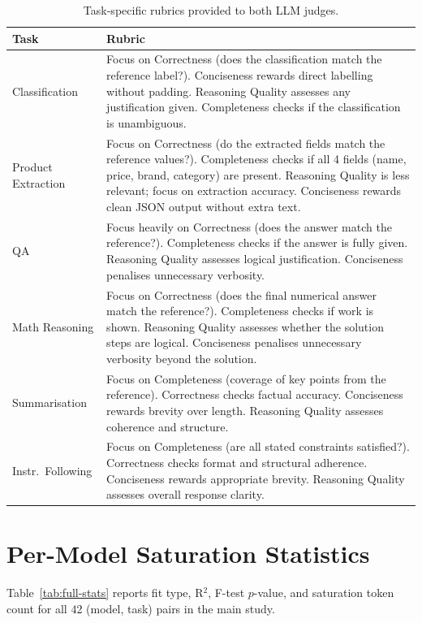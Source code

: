 \begin{table}[h]
\centering
\caption{Task-specific rubrics provided to both LLM judges.}
\label{tab:rubrics}
\small
\begin{tabular}{lp{10cm}}
\toprule
Task & Rubric \\
\midrule
Classification &
  Focus on Correctness (does the classification match the reference label?).
  Conciseness rewards direct labelling without padding.
  Reasoning Quality assesses any justification given.
  Completeness checks if the classification is unambiguous. \\
\addlinespace
Product Extraction &
  Focus on Correctness (do the extracted fields match the reference values?).
  Completeness checks if all 4 fields (name, price, brand, category) are present.
  Reasoning Quality is less relevant; focus on extraction accuracy.
  Conciseness rewards clean JSON output without extra text. \\
\addlinespace
QA &
  Focus heavily on Correctness (does the answer match the reference?).
  Completeness checks if the answer is fully given.
  Reasoning Quality assesses logical justification.
  Conciseness penalises unnecessary verbosity. \\
\addlinespace
Math Reasoning &
  Focus on Correctness (does the final numerical answer match the reference?).
  Completeness checks if work is shown.
  Reasoning Quality assesses whether the solution steps are logical.
  Conciseness penalises unnecessary verbosity beyond the solution. \\
\addlinespace
Summarisation &
  Focus on Completeness (coverage of key points from the reference).
  Correctness checks factual accuracy.
  Conciseness rewards brevity over length.
  Reasoning Quality assesses coherence and structure. \\
\addlinespace
Instr.\ Following &
  Focus on Completeness (are all stated constraints satisfied?).
  Correctness checks format and structural adherence.
  Conciseness rewards appropriate brevity.
  Reasoning Quality assesses overall response clarity. \\
\bottomrule
\end{tabular}
\end{table}


\section{Per-Model Saturation Statistics}
\label{app:stats}

Table~\ref{tab:full-stats} reports fit type, R$^2$, F-test $p$-value, and
saturation token count for all 42 (model, task) pairs in the main study.

